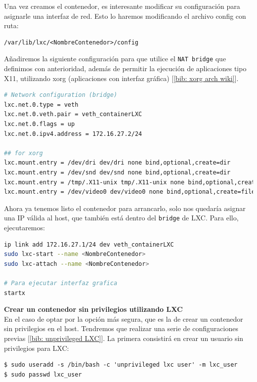 \documentclass[a4paper, oneside, 12pt]{book}
\begin{document}
	\pagebreak
	
	\noindent Una vez creamos el contenedor, es interesante modificar su configuración para asignarle una interfaz de red. Esto lo haremos modificando el archivo config con ruta: 
	\begin{verbatim}
/var/lib/lxc/<NombreContenedor>/config
	\end{verbatim}
	\noindent Añadiremos la siguiente configuración para que utilice el \texttt{NAT bridge} que definimos con anterioridad, además de permitir la ejecución de aplicaciones tipo X11, utilizando xorg (aplicaciones con interfaz gráfica) [\ref{bib: xorg arch wiki}].
	\begin{lstlisting}[language=Bash, caption={Configuración interfaz NAT bridge y aplicaciones X a un contenedor LXC}]
# Network configuration (bridge)
lxc.net.0.type = veth
lxc.net.0.veth.pair = veth_containerLXC
lxc.net.0.flags = up
lxc.net.0.ipv4.address = 172.16.27.2/24

## for xorg
lxc.mount.entry = /dev/dri dev/dri none bind,optional,create=dir
lxc.mount.entry = /dev/snd dev/snd none bind,optional,create=dir
lxc.mount.entry = /tmp/.X11-unix tmp/.X11-unix none bind,optional,create=dir,ro
lxc.mount.entry = /dev/video0 dev/video0 none bind,optional,create=file
	\end{lstlisting}
	
	\noindent Ahora ya tenemos listo el contenedor para arrancarlo, solo nos quedaría asignar una IP válida al host, que también está dentro del \texttt{bridge} de LXC. Para ello, ejecutaremos:
	\begin{lstlisting}[language=Bash, caption={Asignar IP al host LXC y arrancar un contenedor}]
ip link add 172.16.27.1/24 dev veth_containerLXC
sudo lxc-start --name <NombreContenedor>
sudo lxc-attach --name <NombreContenedor>

# Para ejecutar interfaz grafica
startx
	\end{lstlisting}

	\vspace{20px}

	\noindent \textbf{\large Crear un contenedor sin privilegios utilizando LXC}\\
	
	\noindent En el caso de optar por la opción más segura, que es la de crear un contenedor sin privilegios en el host. Tendremos que realizar una serie de configuraciones previas [\ref{bib: unprivileged LXC}]. La primera consistirá en crear un usuario sin privilegios para LXC:
	\begin{verbatim}
$ sudo useradd -s /bin/bash -c 'unprivileged lxc user' -m lxc_user
$ sudo passwd lxc_user
	\end{verbatim}
\end{document}
